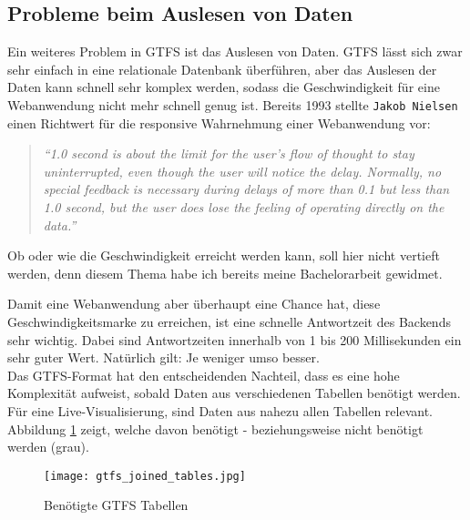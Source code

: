 
      \subsection*{Probleme beim Auslesen von Daten}
      \label{sub:probleme_beim_auslesen_von_daten}
        Ein weiteres Problem in GTFS ist das Auslesen von Daten. GTFS lässt sich zwar sehr einfach in eine relationale Datenbank überführen, aber das Auslesen der Daten kann schnell sehr komplex werden, sodass die Geschwindigkeit für eine Webanwendung nicht mehr schnell genug ist. Bereits 1993 stellte \texttt{Jakob Nielsen} einen Richtwert für die responsive Wahrnehmung einer Webanwendung vor:

        \begin{quote}
          \textit{"`1.0 second is about the limit for the user's flow of thought to stay uninterrupted, even though the user will notice the delay. Normally, no special feedback is necessary during delays of more than 0.1 but less than 1.0 second, but the user does lose the feeling of operating directly on the data."'}\parencite{nielsen}
        \end{quote}

        Ob oder wie die Geschwindigkeit erreicht werden kann, soll hier nicht vertieft werden, denn diesem Thema habe ich bereits meine Bachelorarbeit gewidmet\parencite{lorer}.

        Damit eine Webanwendung aber überhaupt eine Chance hat, diese Geschwindigkeitsmarke zu erreichen, ist eine schnelle Antwortzeit des Backends sehr wichtig. Dabei sind Antwortzeiten innerhalb von 1 bis 200 Millisekunden ein sehr guter Wert. Natürlich gilt: Je weniger umso besser.\\

        Das GTFS-Format hat den entscheidenden Nachteil, dass es eine hohe Komplexität aufweist, sobald Daten aus verschiedenen Tabellen benötigt werden. Für eine Live-Visualisierung, sind Daten aus nahezu allen Tabellen relevant. Abbildung \ref{fig:gtfs_joined_tables} zeigt, welche davon benötigt - beziehungsweise nicht benötigt werden (grau).

        \begin{figure}[htbp]
          \begin{center}
            \texttt{[image: gtfs\_joined\_tables.jpg]}
            \caption{Benötigte GTFS Tabellen\parencite{google_gtfs_reference}}
            \label{fig:gtfs_joined_tables}
          \end{center}
        \end{figure}

